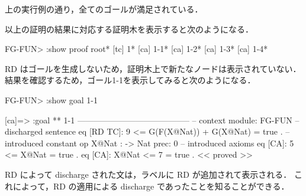\documentclass[a4paper,oneside,10pt,here]{memoir}
\newenvironment{vvtm}%
{\parskip=0pt\lineskip=0pt\begin{center}\begin{minipage}{0.8\textwidth}\begin{snugshade}}%
  {\end{snugshade}\end{minipage}\end{center}}
\begin{document}
上の実行例の通り，全てのゴールが満足されている．

以上の証明の結果に対応する証明木を表示すると次のようになる．
\begin{vvtm}
  \begin{simplev}
FG-FUN> :show proof
root*
[tc]  1*
[ca]  1-1*
[ca]  1-2*
[ca]  1-3*
[ca]  1-4*
  \end{simplev}
\end{vvtm}
RD はゴールを生成しないため，証明木上で新たなノードは表示されていない．
結果を確認するため，ゴール1-1を表示してみると次のようになる．
\begin{vvtm}
  \begin{simplev}
FG-FUN> :show goal 1-1

[ca]=>
:goal { ** 1-1 -----------------------------------------
  -- context module: FG-FUN
  -- discharged sentence
    eq [RD TC]: 9 <= G(F(X@Nat)) + G(X@Nat)
        = true .
  -- introduced constant
    op X@Nat : -> Nat { prec: 0 }
  -- introduced axioms
    eq [CA]: 5 <= X@Nat = true .
    eq [CA]: X@Nat <= 7 = true .
} << proved >>
  \end{simplev}
\end{vvtm}
RD によって discharge された文は，ラベルに RD が追加されて表示される．
これによって，RD の適用による discharge であったことを知ることができる．



\end{document}
